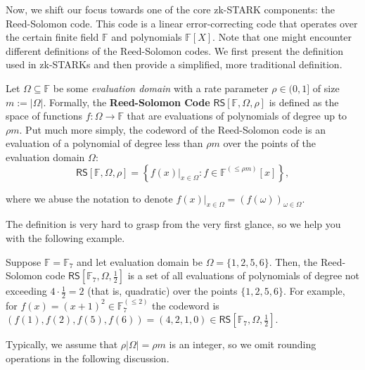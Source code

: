 \documentclass[../lecture-notes-148x210.tex]{subfiles}
\begin{document}
Now, we shift our focus towards one of the core zk-STARK components: the
Reed-Solomon code. This code is a linear error-correcting code that operates
over the certain finite field $\mathbb{F}$ and polynomials $\mathbb{F}[X]$. Note
that one might encounter different definitions of the Reed-Solomon codes. We
first present the definition used in zk-STARKs and then provide a simplified,
more traditional definition.

\begin{definition}
Let $\Omega \subseteq \mathbb{F}$ be some \emph{evaluation domain} with a rate
parameter $\rho \in (0,1]$ of size $m := |\Omega|$. Formally, the
\textbf{Reed-Solomon Code} $\mathsf{RS}[\mathbb{F},\Omega,\rho]$ is defined as
the space of functions $f: \Omega \to \mathbb{F}$ that are evaluations of
polynomials of degree up to $\rho m$. Put much more simply, the codeword
of the Reed-Solomon code is an evaluation of a polynomial of degree less than
$\rho m$ over the points of the evaluation domain $\Omega$:
\begin{equation*}
    \mathsf{RS}[\mathbb{F},\Omega,\rho] = \left\{f(x)\big|_{x \in \Omega}: f \in \mathbb{F}^{(\leq \rho m)}[x]\right\},
\end{equation*}

where we abuse the notation to denote $f(x)\big|_{x \in \Omega} = \left(f(\omega)\right)_{\omega \in \Omega}$.
\end{definition}

The definition is very hard to grasp from the very first glance, so we help you
with the following example.

\begin{example}
    Suppose $\mathbb{F} = \mathbb{F}_7$ and let evaluation domain be $\Omega =
    \{1,2,5,6\}$. Then, the Reed-Solomon code $\mathsf{RS}[\mathbb{F}_7, \Omega,
    \frac{1}{2}]$ is a set of all evaluations of polynomials of degree not
    exceeding $4 \cdot \frac{1}{2}=2$ (that is, quadratic) over the points
    $\{1,2,5,6\}$. For example, for $f(x) = (x+1)^2 \in \mathbb{F}^{(\leq 2)}_7$
    the codeword is $(f(1),f(2),f(5),f(6)) = (4, 2, 1, 0) \in
    \mathsf{RS}[\mathbb{F}_7, \Omega, \frac{1}{2}]$. 
\end{example}

\begin{remark}
    Typically, we assume that $\rho|\Omega|=\rho m$ is an integer, so we omit rounding
    operations in the following discussion.
\end{remark}
\end{document}
